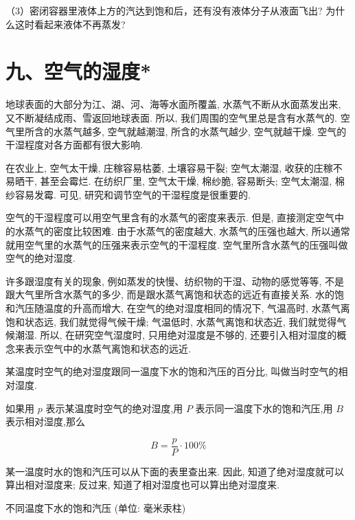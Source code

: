\documentclass[10pt]{article}
\begin{document}
（3）密闭容器里液体上方的汽达到饱和后，还有没有液体分子从液面飞出? 为什么这时看起来液体不再蒸发?

\section*{九、空气的湿度*}

地球表面的大部分为江、湖、河、海等水面所覆盖, 水蒸气不断从水面蒸发出来, 又不断凝结成雨、雪返回地球表面. 所以, 我们周围的空气里总是含有水蒸气的. 空气里所含的水蒸气越多, 空气就越潮湿, 所含的水蒸气越少, 空气就越干燥. 空气的干湿程度对各方面都有很大影响.

在农业上, 空气太干燥, 庄稼容易枯萎, 土壤容易干裂; 空气太潮湿, 收获的庄稼不易晒干, 甚至会霉烂. 在纺织厂里, 空气太干燥, 棉纱脆, 容易断头; 空气太潮湿, 棉纱容易发霉. 可见, 研究和调节空气的干湿程度是很重要的.

空气的干湿程度可以用空气里含有的水蒸气的密度来表示. 但是, 直接测定空气中的水蒸气的密度比较困难. 由于水蒸气的密度越大, 水蒸气的压强也越大, 所以通常就用空气里的水蒸气的压强来表示空气的干湿程度. 空气里所含水蒸气的压强叫做空气的绝对湿度.

许多跟湿度有关的现象, 例如蒸发的快慢、纺织物的干湿、动物的感觉等等, 不是跟大气里所含水蒸气的多少, 而是跟水蒸气离饱和状态的远近有直接关系. 水的饱和汽压随温度的升高而增大, 在空气的绝对湿度相同的情况下, 气温高时, 水蒸气离饱和状态远, 我们就觉得气候干燥; 气温低时, 水蒸气离饱和状态近, 我们就觉得气候潮湿. 所以, 在研究空气湿度时, 只用绝对湿度是不够的, 还要引入相对湿度的概念来表示空气中的水蒸气离饱和状态的远近.

某温度时空气的绝对湿度跟同一温度下水的饱和汽压的百分比, 叫做当时空气的相对湿度.

如果用 \(p\) 表示某温度时空气的绝对湿度,用 \(P\) 表示同一温度下水的饱和汽压,用 \(B\) 表示相对湿度,那么

\[
B = \frac{p}{P} \cdot {100}\%
\]

某一温度时水的饱和汽压可以从下面的表里查出来. 因此, 知道了绝对湿度就可以算出相对湿度来; 反过来, 知道了相对湿度也可以算出绝对湿度来.

不同温度下水的饱和汽压 (单位: 毫米汞柱)
\end{document}
